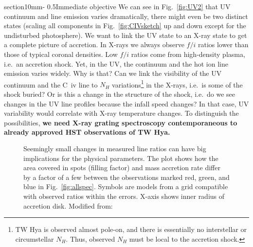 \documentclass[letterpaper,11pt,twocolumn]{article}
\makeatletter
\renewcommand{\section}{\@startsection%
{section}{1}{0mm}{-\baselineskip}%
{0.5\baselineskip}{\normalfont\Large\bfseries}}%
\makeatother
\begin{document}
\section{Immediate objective}
We can see in Fig.~\ref{fig:UV2} that UV continuum and line emission
varies dramatically, there might even be two distinct states (scaling
all components in Fig.~\ref{fig:CIVsketch} up and down except for the
undisturbed photosphere). We want to link the UV state to an X-ray
state to get a complete picture of accretion. In X-rays we always
observe $f/i$ ratios lower than those of typical coronal
densities. Low $f/i$ ratios come from high-density plasma, i.e.\ an
accretion shock. Yet, in the UV, the continuum and the hot ion line
emission varies widely. Why is that? Can we link the visibility of the
UV continuum and the C~{\sc iv} line to $N_H$ variations\footnote{TW
  Hya is observed almost pole-on, and there is essentially no interstellar
  or circumstellar $N_H$. Thus, observed $N_H$ must be local to the
  accretion shock.} in the X-rays, i.e.\ is some of the shock buried?
Or is this a change in the structure of the shock, i.e.\ do we see
changes in the UV line profiles because the infall speed changes? In
that case, UV variability would correlate with X-ray temperature
changes.  To distinguish the possibilities, \textbf{we need
  X-ray grating spectroscopy contemporaneous to already approved HST
  observations of TW Hya.}




\begin{figure}[t!]
\centering
{}
\caption{Seemingly small changes in measured line ratios can have big
  implications for the physical parameters. The plot shows how the
  area covered in spots (filling factor) and mass accretion rate
  differ by a factor of a few between the observations marked red,
  green, and blue in Fig.~\ref{fig:allspec}. Symbols are models from a
  grid compatible with observed ratios within the errors. X-axis shows
  inner radius of accretion disk. Modified from:
\label{fig:Brickhouse_3} }
\end{figure}
\end{document}
